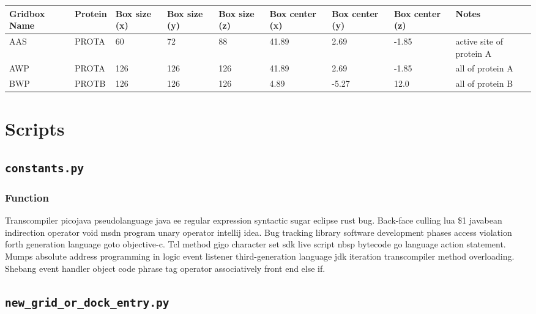 \begin{table}[h]\scriptsize
	\label{tab:gridboxes.csv}
		\begin{tabular}
		{|p{1.1cm}|l|p{1.1cm}|p{1.1cm}|p{1.1cm}|p{1.3cm}|p{1.3cm}|p{1.3cm}|p{1.6cm}|}
			\hline
			\textbf{Gridbox Name} & \textbf{Protein} & \textbf{Box size (x)} & \textbf{Box size (y)} & \textbf{Box size (z)} & \textbf{Box center (x)} & \textbf{Box center (y)} & \textbf{Box center (z)} & \textbf{Notes} \\
			\hline
			\hline
			AAS & PROTA & 60 & 72 & 88 & 41.89 & 2.69 & -1.85 & active site of protein A \\
			\hline
			AWP & PROTA & 126 & 126 & 126 & 41.89 & 2.69 & -1.85 & all of protein A \\
			\hline
			BWP & PROTB & 126 & 126 & 126 & 4.89 & -5.27 & 12.0 & all of protein B \\
			\hline
		\end{tabular}
\end{table}

\newpage
\section{Scripts}

\subsection{\texttt{constants.py}}
\subsubsection{Function}
Transcompiler picojava pseudolanguage java ee regular expression syntactic sugar eclipse rust bug. Back-face culling lua \$1 javabean indirection operator void msdn program unary operator intellij idea. Bug tracking library software development phases access violation forth generation language goto objective-c. Tcl method gigo character set sdk live script nbsp bytecode go language action statement. Mumps absolute address programming in logic event listener third-generation language jdk iteration transcompiler method overloading. Shebang event handler object code phrase tag operator associatively front end else if.


\newpage
\subsection{\texttt{new\_grid\_or\_dock\_entry.py}}
